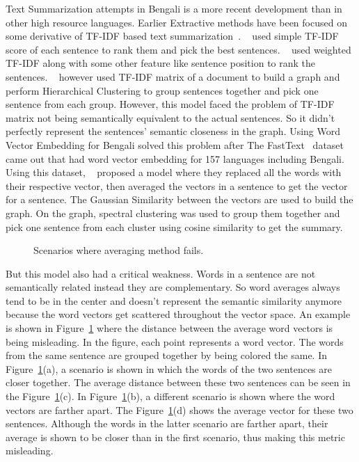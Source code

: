 Text Summarization attempts in Bengali is a more recent development than in other high resource languages.
Earlier Extractive methods have been focused on some derivative of TF-IDF based text
summarization~\cite{chowdhury-etal-2021-tfidf-clustering,das-2022-tfidf,sarkar-2012-tfidf}.
\citeauthor{sarkar-2012-tfidf}~\cite{sarkar-2012-tfidf} used simple TF-IDF score of each sentence to rank them and
pick the best sentences.
\citeauthor{das-2022-tfidf}~\cite{das-2022-tfidf} used weighted TF-IDF along with some other feature like sentence position
to rank the sentences.
\citeauthor{chowdhury-etal-2021-tfidf-clustering}~\cite{chowdhury-etal-2021-tfidf-clustering} however used TF-IDF
matrix of a document to build a graph and perform Hierarchical Clustering to group sentences together and pick one
sentence from each group.
However, this model faced the problem of TF-IDF matrix not being semantically equivalent to the actual sentences.
So it didn't perfectly represent the sentences' semantic closeness in the graph.
Using Word Vector Embedding for Bengali solved this problem after The FastText~\cite{grave-etal-2018-fasttext} dataset
came out that had word vector embedding for 157 languages including Bengali.
Using this dataset, \citeauthor{roychowdhury-etal-2022-spectral-base}~\cite{roychowdhury-etal-2022-spectral-base}
proposed a model where they replaced all the words with their respective vector, then averaged the vectors in a
sentence to get the vector for a sentence.
The Gaussian Similarity between the vectors are used to build the graph.
On the graph, spectral clustering was used to group them together and pick one sentence from each cluster using cosine
similarity to get the summary.\\

\begin{figure}
    \centering
    
    \caption{Scenarios where averaging method fails.}
    \label{fig:sarkar-problem}
\end{figure}

But this model also had a critical weakness.
Words in a sentence are not semantically related instead they are complementary.
So word averages always tend to be in the center and doesn't represent the semantic similarity anymore because the word
vectors get scattered throughout the vector space.
An example is shown in Figure~\ref{fig:sarkar-problem} where the distance between the average word vectors is being
misleading.
In the figure, each point represents a word vector.
The words from the same sentence are grouped together by being colored the same.
In Figure~\ref{fig:sarkar-problem}(a), a scenario is shown in which the words of the two sentences are closer together.
The average distance between these two sentences can be seen in the Figure~\ref{fig:sarkar-problem}(c).
In Figure~\ref{fig:sarkar-problem}(b), a different scenario is shown where the word vectors are farther apart.
The Figure~\ref{fig:sarkar-problem}(d) shows the average vector for these two sentences.
Although the words in the latter scenario are farther apart, their average is shown to be closer than in the first
scenario, thus making this metric misleading.